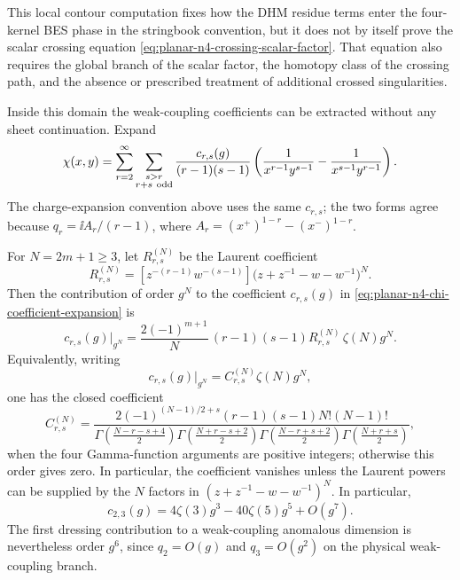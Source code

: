 This local contour computation fixes how the DHM
residue terms enter the four-kernel BES phase in the stringbook convention,
but it does not by itself prove the scalar crossing equation
\eqref{eq:planar-n4-crossing-scalar-factor}.  That equation also requires the
global branch of the scalar factor, the homotopy class of the crossing path,
and the absence or prescribed treatment of additional crossed singularities.

Inside this domain the weak-coupling coefficients can be extracted without
any sheet continuation.  Expand
\begin{equation}
  \chi(x,y)
  =
  \sum_{r=2}^{\infty}
  \sum_{\substack{s>r\\ r+s\ {\rm odd}}}
  \frac{c_{r,s}(g)}{(r-1)(s-1)}
  \left(
    \frac{1}{x^{r-1}y^{s-1}}
    -
    \frac{1}{x^{s-1}y^{r-1}}
  \right).
  \label{eq:planar-n4-chi-coefficient-expansion}
\end{equation}
The charge-expansion convention above uses the same \(c_{r,s}\); the two
forms agree because \(q_r=\ii A_r/(r-1)\), where
\(A_r=(x^+)^{1-r}-(x^-)^{1-r}\).

\begin{proposition}
\label{prop:planar-n4-dhm-weak-coefficients}
For \(N=2m+1\geq3\), let \(R^{(N)}_{r,s}\) be the Laurent coefficient
\[
  R^{(N)}_{r,s}
  =
  [z^{-(r-1)}w^{-(s-1)}]
  \bigl(z+z^{-1}-w-w^{-1}\bigr)^N .
\]
Then the contribution of order \(g^N\) to the coefficient \(c_{r,s}(g)\) in
\eqref{eq:planar-n4-chi-coefficient-expansion} is
\begin{equation}
  c_{r,s}(g)\big|_{g^N}
  =
  \frac{2(-1)^{m+1}}{N}\,
  (r-1)(s-1)R^{(N)}_{r,s}\,
  \zeta(N)g^N .
  \label{eq:planar-n4-dhm-residue-coefficient}
\end{equation}
Equivalently, writing
\[
  c_{r,s}(g)\big|_{g^N}=C^{(N)}_{r,s}\zeta(N)g^N,
\]
one has the closed coefficient
\begin{equation}
  C^{(N)}_{r,s}
  =
  \frac{
    2(-1)^{(N-1)/2+s}(r-1)(s-1)N!(N-1)!
  }{
    \Gamma\!\left(\frac{N-r-s+4}{2}\right)
    \Gamma\!\left(\frac{N+r-s+2}{2}\right)
    \Gamma\!\left(\frac{N-r+s+2}{2}\right)
    \Gamma\!\left(\frac{N+r+s}{2}\right)
  },
  \label{eq:planar-n4-dhm-closed-weak-coefficient}
\end{equation}
when the four Gamma-function arguments are positive integers; otherwise this
order gives zero.  In particular, the coefficient vanishes unless the
Laurent powers can be supplied by the \(N\) factors in
\((z+z^{-1}-w-w^{-1})^N\).
In particular,
\[
  c_{2,3}(g)=4\zeta(3)g^3-40\zeta(5)g^5+O(g^7).
\]
The first dressing contribution to a weak-coupling anomalous dimension is
nevertheless order \(g^6\), since \(q_2=O(g)\) and \(q_3=O(g^2)\) on the
physical weak-coupling branch.
\end{proposition}

